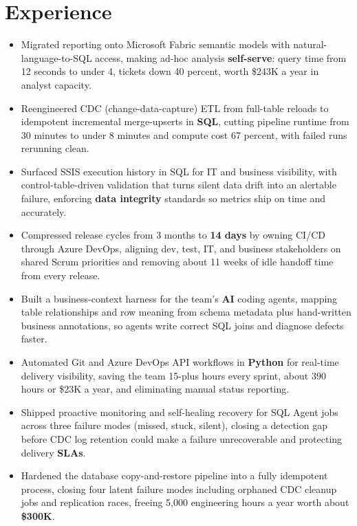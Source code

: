 \documentclass[letterpaper,10pt]{article}
\begin{document}
\section{Experience}
\begin{itemize}
\item Migrated reporting onto Microsoft Fabric semantic models with natural-language-to-SQL access, making ad-hoc analysis \textbf{self-serve}: query time from 12 seconds to under 4, tickets down 40 percent, worth \$243K a year in analyst capacity.
\item Reengineered CDC (change-data-capture) ETL from full-table reloads to idempotent incremental merge-upserts in \textbf{SQL}, cutting pipeline runtime from 30 minutes to under 8 minutes and compute cost 67 percent, with failed runs rerunning clean.
\item Surfaced SSIS execution history in SQL for IT and business visibility, with control-table-driven validation that turns silent data drift into an alertable failure, enforcing \textbf{data integrity} standards so metrics ship on time and accurately.
\item Compressed release cycles from 3 months to \textbf{14 days} by owning CI/CD through Azure DevOps, aligning dev, test, IT, and business stakeholders on shared Scrum priorities and removing about 11 weeks of idle handoff time from every release.
\item Built a business-context harness for the team's \textbf{AI} coding agents, mapping table relationships and row meaning from schema metadata plus hand-written business annotations, so agents write correct SQL joins and diagnose defects faster.
\item Automated Git and Azure DevOps API workflows in \textbf{Python} for real-time delivery visibility, saving the team 15-plus hours every sprint, about 390 hours or \$23K a year, and eliminating manual status reporting.
\item Shipped proactive monitoring and self-healing recovery for SQL Agent jobs across three failure modes (missed, stuck, silent), closing a detection gap before CDC log retention could make a failure unrecoverable and protecting delivery \textbf{SLAs}.
\item Hardened the database copy-and-restore pipeline into a fully idempotent process, closing four latent failure modes including orphaned CDC cleanup jobs and replication races, freeing 5,000 engineering hours a year worth about \textbf{\$300K}.
\end{itemize}
\end{document}

